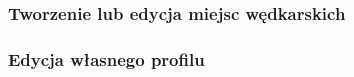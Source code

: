 \documentclass{article}
\begin{document}
\subsubsection{Tworzenie lub edycja miejsc wędkarskich}
\subsubsection{Edycja własnego profilu}
\end{document}
